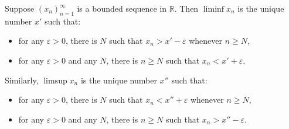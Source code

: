 Suppose $(x_n)_{n=1}^{\infty}$ is a bounded sequence in $\mathbb{R}$. Then $\liminf x_n$ is the unique number $x'$ such that:
\begin{itemize}
\item[(i')] for any $\varepsilon > 0$, there is $N$ such that $x_n > x' - \varepsilon$ whenever $n \geq N$,
\item[(ii')] for any $\varepsilon > 0$ and any $N$, there is $n \geq N$ such that $x_n < x' + \varepsilon$.
\end{itemize}
Similarly, $\limsup x_n$ is the unique number $x''$ such that:
\begin{itemize}
\item[(i'')] for any $\varepsilon > 0$, there is $N$ such that $x_n < x'' + \varepsilon$ whenever $n \geq N$,
\item[(ii'')] for any $\varepsilon > 0$ and any $N$, there is $n \geq N$ such that $x_n > x'' - \varepsilon$.
\end{itemize}
